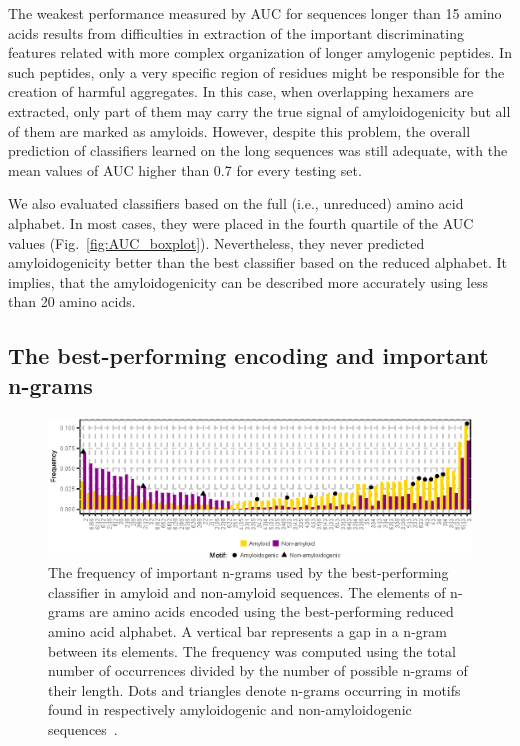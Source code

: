 \documentclass[fleqn,10pt,twoside]{gcb15submission}
\begin{document}
  The weakest performance measured by AUC for sequences longer than 15 amino 
acids results from difficulties in extraction of the important discriminating 
features related with more complex organization of longer amylogenic peptides. 
In such peptides, only a very specific region of residues might be responsible 
for the creation of harmful aggregates. In this case, when overlapping hexamers 
are extracted, only part of them may carry the true signal of amyloidogenicity 
but all of them are marked as amyloids. However, despite this problem, the 
overall prediction of classifiers learned on the long sequences was still 
adequate, with the mean values of AUC higher than 0.7 for every testing set. 

  We also evaluated classifiers based on the full (i.e., unreduced) amino acid 
alphabet. In most cases, they were placed in the fourth quartile of the AUC 
values (Fig.~\ref{fig:AUC_boxplot}). Nevertheless, they never predicted 
amyloidogenicity better than the best classifier based on the reduced alphabet. 
It implies, that the amyloidogenicity can be described more accurately using less 
than 20 amino acids.

\subsection{The best-performing encoding and important n-grams}


\begin{figure}[!tpb]
\centerline{\includegraphics{figures/ngrams.eps}}
\caption{The frequency of important n-grams used by the best-performing 
classifier in amyloid and non-amyloid sequences. The elements of n-grams are 
amino acids encoded using the best-performing reduced amino acid alphabet. A vertical bar represents a gap in a n-gram between 
its elements. The frequency was computed using the total number of occurrences 
divided by the number of possible n-grams of their length. Dots and triangles 
denote n-grams occurring in motifs found in respectively amyloidogenic and 
non-amyloidogenic sequences~\citep{lopez_de_la_paz_sequence_2004}.}\label{fig:ngrams} 
\end{figure}
%
%
%
\end{document}
